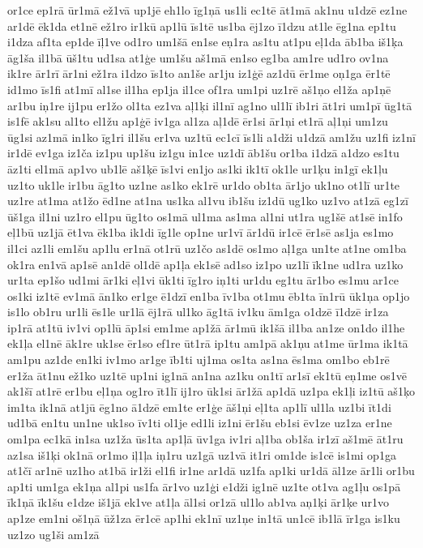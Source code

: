 {or1ce
ep1rā
ūr1mā
ež1vā
up1jē
eh1lo
īg1ņā
us1li
ec1tē
āt1mā
ak1nu
u1dzē
ez1ne
ar1dē
ēk1da
et1nē
ež1ro
ir1kū
ap1lū
īs1tē
us1ba
ēj1zo
ī1dzu
at1le
ēg1na
ep1tu
i1dza
af1ta
ep1de
īļ1ve
od1ro
um1šā
en1se
eņ1ra
as1tu
at1pu
eļ1da
āb1ba
iš1ķa
āg1ša
il1bā
ūš1tu
ud1sa
at1ģe
um1šu
aš1mā
en1so
eg1ba
am1re
ud1ro
ov1na
ik1re
ār1rī
ār1ni
ež1ra
i1dzo
īs1to
an1še
ar1ju
iz1ģē
az1dū
ēr1me
oņ1ga
ēr1tē
id1mo
īs1fi
at1mī
al1se
il1ha
ep1ja
il1ce
of1ra
um1pi
uz1rē
aš1ņo
el1ža
ap1ņē
ar1bu
iņ1re
ij1pu
er1žo
ol1ta
ez1va
aļ1ķi
il1nī
ag1no
ul1lī
ib1ri
āt1ri
um1pī
ūg1tā
is1fē
ak1su
al1to
el1žu
ap1ģē
iv1ga
al1za
aļ1dē
ēr1si
ār1ņi
et1rā
aļ1ņi
um1zu
ūg1si
az1mā
in1ko
īg1ri
il1šu
er1va
uz1tū
ec1cī
īs1li
a1dži
u1dzā
am1žu
uz1fi
iz1nī
ir1dē
ev1ga
iz1ča
iz1pu
up1šu
iz1gu
in1ce
uz1dī
āb1šu
or1ba
i1dzā
a1dzo
es1tu
āz1ti
el1mā
ap1vo
ub1lē
aš1ķē
īs1vi
en1jo
as1ki
ik1tī
ok1le
ur1ķu
in1gī
ek1ļu
uz1to
uk1le
ir1bu
āg1to
uz1ne
as1ko
ek1rē
ur1do
ob1ta
ār1jo
uk1no
ot1lī
ur1te
uz1re
at1ma
at1žo
ēd1ne
at1na
us1ka
al1vu
ib1šu
iz1dū
ug1ko
uz1vo
at1zā
eg1zī
ūš1ga
il1ni
uz1ro
el1pu
ūg1to
os1mā
ul1ma
as1ma
al1ni
ut1ra
ug1šē
at1sē
in1fo
eļ1bū
uz1jā
ēt1va
ēk1ba
ik1di
īg1le
op1ne
ur1vī
ār1dū
ir1cē
ēr1sē
as1ja
es1mo
il1ci
az1li
em1šu
ap1lu
er1nā
ot1rū
uz1čo
as1dē
os1mo
aļ1ga
un1te
at1ne
om1ba
ok1ra
en1vā
ap1sē
an1dē
ol1dē
ap1ļa
ek1sē
ad1so
iz1po
uz1lī
īk1ne
ud1ra
uz1ko
ur1ta
ep1šo
ud1mi
ār1ki
eļ1vi
ūk1ti
īg1ro
iņ1ti
ur1du
eg1tu
ār1bo
es1mu
ar1ce
os1ki
iz1tē
ev1mā
ān1ko
er1ge
ē1dzī
en1ba
īv1ba
ot1mu
ēb1ta
īn1rū
ūk1ņa
op1jo
is1lo
ob1ru
ur1li
ēs1le
ur1lā
ēj1rā
ul1ko
āg1tā
iv1ku
ām1ga
o1dzē
ī1dzē
ir1za
ip1rā
at1tū
iv1vi
op1lū
āp1si
em1me
ap1žā
ār1mū
ik1šā
il1ba
an1ze
on1do
il1he
ek1ļa
el1nē
āk1re
uk1se
ēr1so
ef1re
ūt1rā
ip1tu
am1pā
ak1ņu
at1me
ūr1ma
ik1tā
am1pu
az1de
en1ki
iv1mo
ar1ge
īb1ti
uj1ma
os1ta
as1na
ēs1ma
om1bo
eb1rē
er1ža
āt1nu
ež1ko
uz1tē
up1ni
ig1nā
an1na
az1ku
on1tī
ar1sī
ek1tū
eņ1me
os1vē
ak1šī
at1rē
er1bu
eļ1ņa
og1ro
īt1lī
ij1ro
ūk1si
ār1žā
ap1dā
uz1pa
ek1ļi
iz1tū
aš1ķo
im1ta
ik1nā
at1jū
ēg1no
ā1dzē
em1te
er1ģe
āš1ņi
eļ1ta
ap1lī
ul1la
uz1bi
īt1di
ud1bā
en1tu
un1ne
uk1so
īv1ti
ol1je
ed1li
iz1ni
ēr1šu
eb1si
ēv1ze
uz1za
er1ne
om1pa
ec1kā
in1sa
uz1ža
ūs1ta
ap1ļā
ūv1ga
iv1ri
aļ1ba
ob1ša
ir1zī
aš1mē
āt1ru
az1sa
iš1ķi
ok1nā
or1mo
iļ1ļa
iņ1ru
uz1gā
uz1vā
it1ri
om1de
is1cē
is1mi
op1ga
at1čī
ar1nē
uz1ho
at1bā
ir1ži
el1fi
ir1ne
ar1dā
uz1fa
ap1ki
ur1dā
āl1ze
ār1li
or1bu
ap1ti
um1ga
ek1ņa
al1pi
us1fa
ār1vo
uz1ģi
e1dži
ig1nē
uz1te
ot1va
ag1ļu
os1pā
īk1ņā
īk1šu
e1dze
iš1jā
ek1ve
at1ļa
āl1si
or1zā
ul1lo
ab1va
aņ1ķi
ār1ķe
ur1vo
ap1ze
em1ni
oš1ņā
ūž1za
ēr1cē
ap1hi
ek1nī
uz1ņe
in1tā
un1cē
ib1lā
īr1ga
is1ku
uz1zo
ug1ši
am1zā
}
